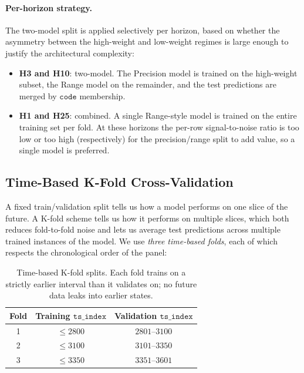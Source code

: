 \paragraph{Per-horizon strategy.}
The two-model split is applied selectively per horizon, based on whether the asymmetry between the high-weight and low-weight regimes is large enough to justify the architectural complexity:

\begin{itemize}
  \item \textbf{H3 and H10}: two-model. The Precision model is trained on the high-weight subset, the Range model on the remainder, and the test predictions are merged by $\mathtt{code}$ membership.
  \item \textbf{H1 and H25}: combined. A single Range-style model is trained on the entire training set per fold. At these horizons the per-row signal-to-noise ratio is too low or too high (respectively) for the precision/range split to add value, so a single model is preferred.
\end{itemize}

\subsection{Time-Based K-Fold Cross-Validation}
\label{sec:two_model:kfold}

A fixed train/validation split tells us how a model performs on one slice of the future. A K-fold scheme tells us how it performs on multiple slices, which both reduces fold-to-fold noise and lets us average test predictions across multiple trained instances of the model. We use \emph{three time-based folds}, each of which respects the chronological order of the panel:

\begin{table}[h]
\centering
\caption{Time-based K-fold splits. Each fold trains on a strictly earlier interval than it validates on; no future data leaks into earlier states.}
\label{tab:two_model_folds}
\begin{tabular}{c c c}
\toprule
Fold & Training $\mathtt{ts\_index}$ & Validation $\mathtt{ts\_index}$ \\
\midrule
1 & $\le 2800$ & $2801$--$3100$ \\
2 & $\le 3100$ & $3101$--$3350$ \\
3 & $\le 3350$ & $3351$--$3601$ \\
\bottomrule
\end{tabular}
\end{table}

